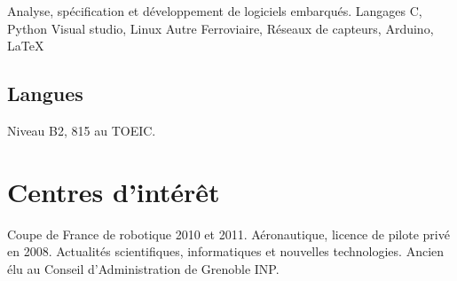 \documentclass[10pt,a4paper]{moderncv}
\begin{document}
    {Analyse, spécification et développement de logiciels embarqués.\newline{}}
    {Langages}
    {C, Python}
    {Visual studio, Linux\newline{}}
    {Autre}
    {Ferroviaire, Réseaux de capteurs, Arduino, \LaTeX} 

  \subsection{Langues}

    {\small Niveau B2, 815 au TOEIC.\newline{}}

\section{Centres d'intérêt}
  {Coupe de France de robotique 2010 et 2011.\newline{}}
  {Aéronautique, licence de pilote privé en 2008.}
  \cvline{}
  {Actualités scientifiques, informatiques et nouvelles technologies.}
  \cvline{}
  {Ancien élu au Conseil d'Administration de Grenoble INP.}
\end{document}
